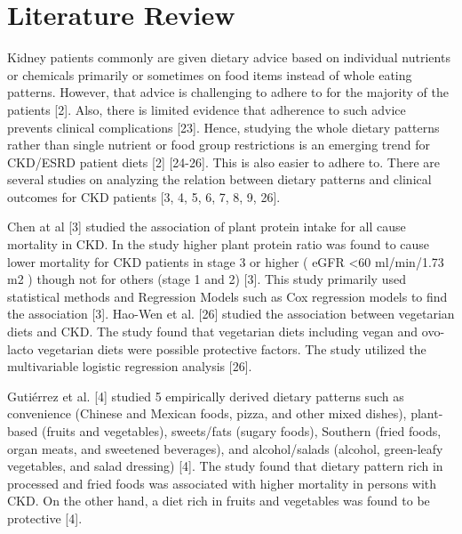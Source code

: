 \section{Literature Review}

\medskip
Kidney patients commonly are given dietary advice based on individual nutrients or chemicals primarily or sometimes on food items instead of whole eating patterns. However, that advice is challenging to adhere to for the majority of the patients [2].
Also, there is limited evidence that adherence to such advice prevents clinical complications [23]. Hence, studying the whole dietary patterns rather than single nutrient or food group restrictions is an emerging trend for CKD/ESRD patient diets [2] [24-26]. This is also easier to adhere to. There are several studies on analyzing the relation between dietary patterns and clinical outcomes for CKD patients [3, 4, 5, 6, 7, 8, 9, 26].

\medskip
\noindent Chen at al [3] studied the association of plant protein intake for all cause mortality in CKD. In the study higher plant protein ratio was found to cause lower mortality for CKD patients in stage 3 or higher ( eGFR  \textless  60 ml/min/1.73 m2 ) though not for others (stage 1 and 2) [3]. This study primarily used statistical methods and Regression Models such as Cox regression models to find the association [3]. Hao-Wen et al. [26] studied the association between vegetarian diets and CKD. The study found that vegetarian diets including vegan and ovo-lacto vegetarian diets were possible protective factors. The study utilized the multivariable logistic regression analysis [26].

\medskip
\noindent Gutiérrez et al. [4] studied 5 empirically derived dietary patterns such as convenience (Chinese and Mexican foods, pizza, and other mixed dishes), plant-based (fruits and vegetables), sweets/fats (sugary foods), Southern (fried foods, organ meats, and sweetened beverages), and alcohol/salads (alcohol, green-leafy vegetables, and salad dressing) [4]. The study found that dietary pattern rich in processed and fried foods was associated with higher mortality in persons with CKD. On the other hand, a diet rich in fruits and
vegetables was found to be protective [4].


